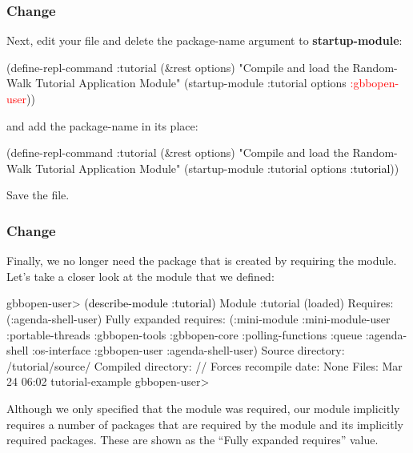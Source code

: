 \documentclass[10pt,twoside,english,pdftex]{article}
\begin{document}
\subsubsection*{Change }
%
Next, edit your  file and delete the 
package-name argument to \textbf{startup-module}:
%
\W\supp
\begin{example}
\textcolor{darkergray}{%
  (define-repl-command :tutorial (\&rest options)
    "Compile and load the Random-Walk Tutorial Application Module"
    (startup-module :tutorial options \textcolor{red}{:gbbopen-user}))}
\end{example}
%
and add the package-name  in its place:
%
\W\supp\notpretop
\begin{example}
\textcolor{darkergray}{%
  (define-repl-command :tutorial (\&rest options)
    "Compile and load the Random-Walk Tutorial Application Module"
    (startup-module :tutorial options \textcolor{black}{:tutorial}))}
\end{example}
%
Save the file.

\subsubsection*{Change }

%
%
Finally, we no longer need the  package that is created by
requiring the  module.  Let's take a closer look at the  module that we defined:
%
\W\supp
\begin{example}
\textcolor{darkergray}{%
  gbbopen-user> \textcolor{black}{(describe-module :tutorial)}
  Module :tutorial (loaded)
    Requires: (:agenda-shell-user)
    Fully expanded requires: (:mini-module :mini-module-user :portable-threads
                              :gbbopen-tools :gbbopen-core :polling-functions
                              :queue :agenda-shell :os-interface :gbbopen-user
                              :agenda-shell-user)
    Source directory: /tutorial/source/
    Compiled directory: //
    Forces recompile date: None
    Files: Mar 24 06:02 tutorial-example
  gbbopen-user>}
\end{example}
%
Although we only specified that the  module was
required, our  module implicitly requires a number of packages
that are required by the  module and its implicitly
required packages.  These are shown as the ``Fully expanded requires'' value.
\end{document}
